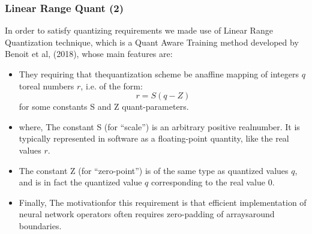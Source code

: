 \begin{frame}
    \frametitle{Linear Range Quant (2)}
        In order to satisfy quantizing requirements we made use of Linear Range Quantization technique, which is a Quant Aware Training method developed by
        Benoit et al, (2018), whose main features are:

        \begin{itemize}
        \item They requiring that thequantization scheme be anaffine mapping of integers $q$ toreal numbers $r$, i.e. of the form:
        \begin{equation}
            r = S(q - Z)
        \end{equation}
        for some constants S and Z quant-parameters.
        \item where, The constant S (for “scale”) is an arbitrary positive realnumber. It is typically represented in software as a floating-point quantity,
            like the real values $r$.
        \item The constant Z (for “zero-point”) is of the same type as quantized values $q$, and is in fact the quantized value $q$ corresponding
            to the real value 0.
        \item Finally, The motivationfor this requirement is that efficient implementation of neural network operators
            often requires zero-padding of arraysaround boundaries.

        \end{itemize}
\end{frame}
